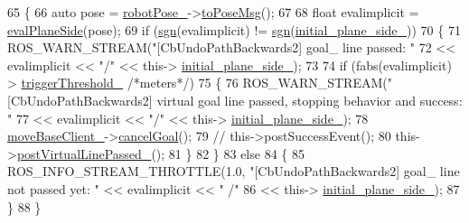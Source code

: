 \begin{DoxyCode}
65 \{
66   \textcolor{keyword}{auto} pose = \hyperlink{classcl__move__base__z_1_1CbUndoPathBackwards2_a2d398dac07efaca840fbcea31957cf7a}{robotPose\_}->\hyperlink{classcl__move__base__z_1_1Pose_a9faf8c6b437ff6b19c8bddd692908dca}{toPoseMsg}();
67 
68   \textcolor{keywordtype}{float} evalimplicit = \hyperlink{classcl__move__base__z_1_1CbUndoPathBackwards2_a20b9a6799b0484810b0319f5a97d020e}{evalPlaneSide}(pose);
69   \textcolor{keywordflow}{if} (\hyperlink{namespacecl__move__base__z_ae144a2fabd00ba70fdc8099878cb3dac}{sgn}(evalimplicit) != \hyperlink{namespacecl__move__base__z_ae144a2fabd00ba70fdc8099878cb3dac}{sgn}(\hyperlink{classcl__move__base__z_1_1CbUndoPathBackwards2_abc388e4c9576f04d1fad869aa8651750}{initial\_plane\_side\_}))
70   \{
71     ROS\_WARN\_STREAM(\textcolor{stringliteral}{"[CbUndoPathBackwards2] goal\_ line passed: "}
72                                       << evalimplicit << \textcolor{stringliteral}{"/"} << this->
      \hyperlink{classcl__move__base__z_1_1CbUndoPathBackwards2_abc388e4c9576f04d1fad869aa8651750}{initial\_plane\_side\_});
73 
74     \textcolor{keywordflow}{if} (fabs(evalimplicit) > \hyperlink{classcl__move__base__z_1_1CbUndoPathBackwards2_a452bcdab678ea02d6d6a0ae06fb484ab}{triggerThreshold\_} \textcolor{comment}{/*meters*/})
75     \{
76        ROS\_WARN\_STREAM(\textcolor{stringliteral}{"[CbUndoPathBackwards2] virtual goal line passed, stopping behavior and success: "}
77                                       << evalimplicit << \textcolor{stringliteral}{"/"} << this->
      \hyperlink{classcl__move__base__z_1_1CbUndoPathBackwards2_abc388e4c9576f04d1fad869aa8651750}{initial\_plane\_side\_});
78       \hyperlink{classcl__move__base__z_1_1CbMoveBaseClientBehaviorBase_ab2ef219464cfac8659b4a87c8d0db6d5}{moveBaseClient\_}->\hyperlink{classsmacc_1_1client__bases_1_1SmaccActionClientBase_aedeaf9704b73bf05b5522f7250416c9a}{cancelGoal}();
79       \textcolor{comment}{// this->postSuccessEvent();}
80       this->\hyperlink{classcl__move__base__z_1_1CbUndoPathBackwards2_a2405e8194c63dce4462b6d4910031fe8}{postVirtualLinePassed\_}();
81     \}
82   \}
83   \textcolor{keywordflow}{else}
84   \{
85     ROS\_INFO\_STREAM\_THROTTLE(1.0, \textcolor{stringliteral}{"[CbUndoPathBackwards2] goal\_ line not passed yet: "} << evalimplicit << \textcolor{stringliteral}{"
      /"}
86                                                                                        << this->
      \hyperlink{classcl__move__base__z_1_1CbUndoPathBackwards2_abc388e4c9576f04d1fad869aa8651750}{initial\_plane\_side\_});
87   \}
88 \}
\end{DoxyCode}
